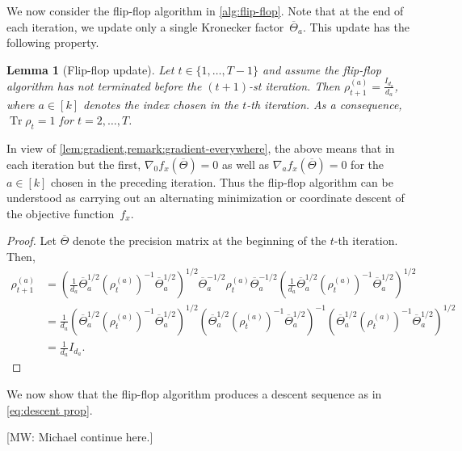 \documentclass[aos]{imsart}
\newtheorem{lemma}[theorem]{Lemma}
\theoremstyle{definition}
\numberwithin{equation}{section}
\DeclareMathOperator{\tr}{Tr}
\newcommand{\otheta}{\overline{\Theta}}
\newcommand{\MW}[1]{{\color{red}[MW: #1]}}
\newcommand{\MW}[1]{{}}
\begin{document}
We now consider the flip-flop algorithm in \cref{alg:flip-flop}.
Note that at the end of each iteration, we update only a single Kronecker factor~$\otheta_a$.
This update has the following property.

\begin{lemma}[Flip-flop update]\label{lemma:flip-flop-update}
  Let $t\in\{1,\dots,T-1\}$ and assume the flip-flop algorithm has not terminated before the $(t+1)$-st iteration.
  Then $\rho_{t+1}^{(a)} = \frac{I_{d_a}}{d_a}$, where $a\in[k]$ denotes the index chosen in the $t$-th iteration.
  As a consequence, $\tr\rho_t=1$ for $t=2,\dots,T$.
\end{lemma}

\noindent
In view of \cref{lem:gradient,remark:gradient-everywhere}, the above means that in each iteration but the first, $\nabla_0 f_x(\otheta) = 0$ as well as $\nabla_a f_x(\otheta) = 0$ for the $a\in[k]$ chosen in the preceding iteration.
Thus the flip-flop algorithm can be understood as carrying out an alternating minimization or coordinate descent of the objective function~$f_x$.

\begin{proof}
Let $\otheta$ denote the precision matrix at the beginning of the $t$-th iteration.
Then,
\begin{align*}
  \rho_{t+1}^{(a)}
&= \left( \frac1{d_a} \otheta_a^{1/2} \left( \rho_t^{(a)} \right)^{-1} \otheta_a^{1/2} \right)^{1/2} \otheta_a^{-1/2}
\rho_t^{(a)}
\otheta_a^{-1/2} \left( \frac1{d_a} \otheta_a^{1/2} \left( \rho_t^{(a)} \right)^{-1} \otheta_a^{1/2} \right)^{1/2} \\
&= \frac1{d_a} \left( \otheta_a^{1/2} \left( \rho_t^{(a)} \right)^{-1} \otheta_a^{1/2} \right)^{1/2}
\!\!\left( \otheta_a^{1/2} \left( \rho_t^{(a)} \right)^{-1} \otheta_a^{1/2} \right)^{-1}\!\!
\left( \otheta_a^{1/2} \left( \rho_t^{(a)} \right)^{-1} \otheta_a^{1/2} \right)^{1/2} \\
&= \frac1{d_a} I_{d_a}.
\end{align*}
\end{proof}

We now show that the flip-flop algorithm produces a descent sequence as in \cref{eq:descent prop}.

\MW{Michael continue here.}
\end{document}
